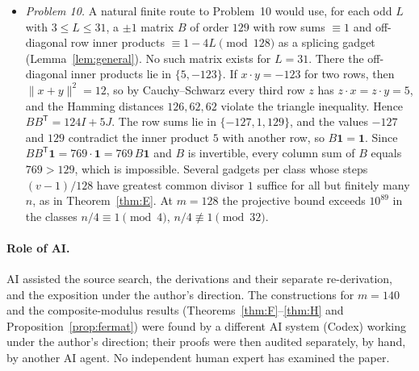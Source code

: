 \documentclass[10pt]{article}
\theoremstyle{remark}
\newcommand{\tr}{^{\mathsf T}}
\newcommand{\one}{\mathbf 1}
\begin{document}
\begin{itemize}
\item \emph{Problem 10.} A natural finite route to Problem~10 would use, for each odd $L$ with $3\le L\le31$, a $\pm1$ matrix $B$ of order $129$ with row sums $\equiv1$ and off-diagonal row inner products $\equiv1-4L\pmod{128}$ as a splicing gadget (Lemma~\ref{lem:general}). No such matrix exists for $L=31$. There the off-diagonal inner products lie in $\{5,-123\}$. If $x\cdot y=-123$ for two rows, then $\|x+y\|^2=12$, so by Cauchy--Schwarz every third row $z$ has $z\cdot x=z\cdot y=5$, and the Hamming distances $126,62,62$ violate the triangle inequality. Hence $BB\tr=124I+5J$. The row sums lie in $\{-127,1,129\}$, and the values $-127$ and $129$ contradict the inner product $5$ with another row, so $B\one=\one$. Since $BB\tr\one=769\cdot\one=769\,B\one$ and $B$ is invertible, every column sum of $B$ equals $769>129$, which is impossible. Several gadgets per class whose steps $(v-1)/128$ have greatest common divisor $1$ suffice for all but finitely many $n$, as in Theorem~\ref{thm:E}. At $m=128$ the projective bound exceeds $10^{89}$ in the classes $n/4\equiv1\pmod4$, $n/4\not\equiv1\pmod{32}$.
\end{itemize}

\paragraph{Role of AI.}
AI assisted the source search, the derivations and their separate re-derivation, and the exposition under the author's direction. The constructions for $m=140$ and the composite-modulus results (Theorems~\ref{thm:F}--\ref{thm:H} and Proposition~\ref{prop:fermat}) were found by a different AI system (Codex) working under the author's direction; their proofs were then audited separately, by hand, by another AI agent. No independent human expert has examined the paper.
\end{document}
